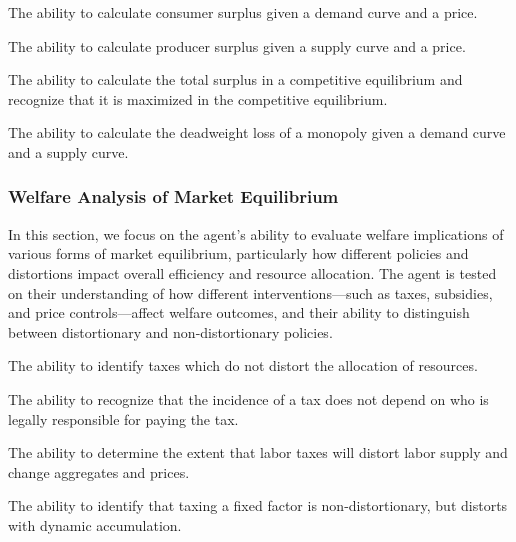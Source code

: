 \begin{el}\label{el:consumer_surplus}
    {The ability to calculate consumer surplus given a demand curve and a price.}
\end{el}

\begin{el}\label{el:producer_surplus}
    {The ability to calculate producer surplus given a supply curve and a price.}
\end{el}

\begin{el}
    {The ability to calculate the total surplus in a competitive equilibrium and recognize that it is maximized in the competitive equilibrium.}
\end{el}

\begin{el}\label{el:deadweight_loss}
    {The ability to calculate the deadweight loss of a monopoly given a demand curve and a supply curve.}
\end{el}


\subsubsection{Welfare Analysis of Market Equilibrium}\label{mod:analysis_equilibrium}
In this section, we focus on the agent's ability to evaluate welfare implications of various forms of market equilibrium, particularly how different policies and distortions impact overall efficiency and resource allocation. The agent is tested on their understanding of how different interventions---such as taxes, subsidies, and price controls---affect welfare outcomes, and their ability to distinguish between distortionary and non-distortionary policies.

\begin{el}
    {The ability to identify taxes which do not distort the allocation of resources.}
\end{el}

\begin{el}
    {The ability to recognize that the incidence of a tax does not depend on who is legally responsible for paying the tax.}
\end{el}

\begin{el}
    {The ability to determine the extent that labor taxes will distort labor supply and change aggregates and prices.}
\end{el}

\begin{el}\label{el:cap_market_distortions}
    {The ability to identify that taxing a fixed factor is non-distortionary, but distorts with dynamic accumulation.}
\end{el}
